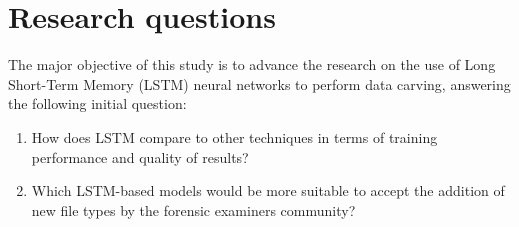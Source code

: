 \section{Research questions}

The major objective of this study is to advance the research on the use of Long Short-Term Memory (LSTM) neural networks to perform data carving, answering the following initial question:

\begin{enumerate}[itemindent=\parindent,label=\textbf{Q\arabic*.}]

    \item How does LSTM compare to other techniques in terms of training performance and quality of results?
    
    \item Which LSTM-based models would be more suitable to accept the addition of new file types by the forensic examiners community? 

\end{enumerate}
